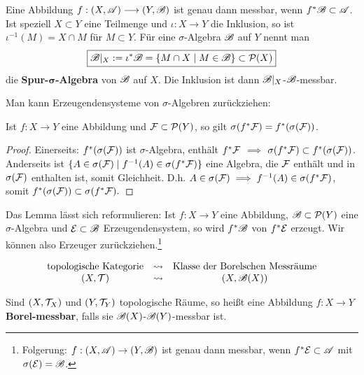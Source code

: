 \begin{definition}
Eine Abbildung $f:(X,\mathscr{A})\longrightarrow (Y,\mathscr{B})$ ist genau dann messbar, wenn $f^*\mathscr{B}\subset\mathscr{A}$. Ist speziell $X\subset Y$ eine Teilmenge und $\iota:X\longrightarrow Y$ die Inklusion, so ist $\iota^{-1}(M)=X\cap M$ für $M\subset Y$. Für eine $\sigma$-Algebra $\mathscr{B}$ auf $Y$ nennt man
$$\boxed{\mathscr{B}|_X := \iota^*\mathscr{B}=\{M\cap X \mid M \in \mathscr{B}\} \subset \mathcal{P}(X)}$$
die \textbf{Spur-$\boldsymbol\sigma$-Algebra} von $\mathscr{B}$ auf $X$. Die Inklusion ist dann $\mathscr{B}|_X$-$\mathscr{B}$-messbar.
\end{definition}
Man kann Erzeugendensysteme von $\sigma$-Algebren zurückziehen:
\begin{lemma}
\begin{mdframed}
Ist $f: X \longrightarrow Y$ eine Abbildung und $\mathcal{F} \subset \mathcal{P}(Y)$, so gilt $\sigma(f^*\mathcal{F}) = f^* (\sigma(\mathcal{F}))$.
\end{mdframed}
\begin{proof}
Einerseits: $f^*(\sigma(\mathcal{F}))$ ist $\sigma$-Algebra, enthält $f^*\mathcal{F}$ $\implies$ $\sigma(f^*\mathcal{F}) \subset  f^*(\sigma(\mathcal{F}))$. \\
Anderseits ist
$
\{A \in \sigma(\mathcal{F}) \mid f^{-1}(A) \in \sigma(f^* \mathcal{F}) \}
$ eine Algebra, die $\mathcal{F}$ enthält und in $\sigma(\mathcal{F})$ enthalten ist, somit Gleichheit. D.h. $A\in \sigma(\mathcal{F})\implies f^{-1}(A) \in \sigma(f^*\mathcal{F})$, somit $f^*(\sigma(\mathcal{F}))\subset \sigma(f^*\mathcal{F}).$ %
\end{proof}
Das Lemma lässt sich reformulieren: Ist $f: X \to Y$ eine Abbildung, $\mathscr{B} \subset \mathcal{P}(Y)$ eine $\sigma$-Algebra und $\mathcal{E} \subset \mathscr{B}$ Erzeugendensystem, so wird $f^*\mathscr{B}$ von $f^* \mathcal{E}$ erzeugt. Wir können also Erzeuger zurückziehen.\footnote{Folgerung: $f:(X,\mathscr{A})\to (Y,\mathscr{B})$ ist genau dann messbar, wenn  $f^*{\mathcal{E}}\subset \mathscr{A}$ mit $\sigma(\mathcal{E})=\mathscr{B}$.}
\end{lemma}
\begin{equation*}
	\begin{array}{ccc}
		\text{topologische Kategorie} & \leadsto & \text{Klasse der Borelschen Messräume} \\
		(X,\mathcal{T}) & \leadsto & (X, \mathscr{B}(X))
	\end{array}
\end{equation*}

\begin{definition}
\begin{mdframed}
Sind $(X,\mathcal{T}_X)$ und $(Y,\mathcal{T}_Y)$ topologische Räume, so heißt eine Abbildung $f:X \longrightarrow Y$ \textbf{Borel-messbar}, falls sie $\mathscr{B}(X)$-$\mathscr{B}(Y)$-messbar ist.
\end{mdframed}
\end{definition}

